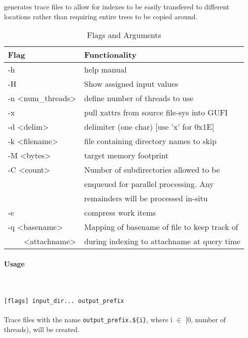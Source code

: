 \subsubsection{\gufidirtrace}
\gufidirtrace generates trace files to allow for indexes to be easily
transfered to different locations rather than requiring entire trees
to be copied around.

\begin{table} [htb]
  \centering
  \begin{tabular}{l|l}
    Flag & Functionality \\
    \hline
    -h & help manual \\
    \hline
    -H & Show assigned input values \\
    \hline
    -n \textless num\_threads\textgreater & define number of threads to use \\
    \hline
    -x & pull xattrs from source file-sys into GUFI \\
    \hline
    -d \textless delim\textgreater & delimiter (one char)  [use 'x' for 0x1E] \\
    \hline
    -k \textless filename\textgreater & file containing directory names to skip \\
    \hline
    -M \textless bytes\textgreater & target memory footprint \\
    \hline
    -C \textless count\textgreater & Number of subdirectories allowed to be \\
                                   & enqueued for parallel processing. Any \\
                                   & remainders will be processed in-situ \\
    \hline
    -e & compress work items \\
    \hline
    -q \textless basename\textgreater & Mapping of basename of file to keep track of \\
    \ \ \ \ \textless attachname\textgreater & during indexing to attachname at query time \\
    \hline
  \end{tabular}
  \caption{\label{fig:Flags_for_dir2trace} \gufidirtrace Flags and Arguments}
\end{table}

\paragraph{Usage} ~\\\\
\gufidirtrace \texttt{[flags] input\_dir... output\_prefix} \\\\
Trace files with the name \texttt{output\_prefix.\$\{i\}}, where i $\in$ [0, number of threads), will be created.
